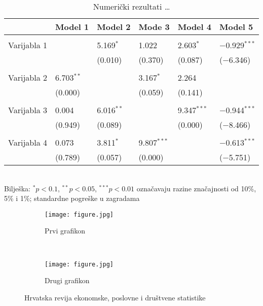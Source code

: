 \documentclass{crebsshr}
\begin{document}
	\medskip
	\begin{table}[H]
	\centering
	\caption{Numerički rezultati \dots}
	\label{tab:tab1}
	\small
	\begin{tabular}{l|lllll} \toprule
		& Model 1   & Model 2  & Mode 3  & Model 4  & Model 5 \\ \hline \hline
		&&&&& \\ [-1em]
		Varijabla 1 &       & 5.169$^{*}$ & 1.022 & 2.603$^{*}$ & $-$0.929$^{***}$  \\
		&       & (0.010)    & (0.370)    & (0.087)    & ($-$6.346)    \\ &&&&& \\ [-1em]
	Varijabla 2  & 6.703$^{**}$ &       & 3.167$^{*}$ & 2.264 &         \\
		& (0.000)   &       & (0.059)  & (0.141)    &         \\ &&&&& \\ [-1em]
		Varijabla 3 & 0.004 & 6.016$^{**}$ &       & 9.347$^{***}$ & $-$0.944$^{***}$  \\
		&    (0.949)   &   (0.089)    &       & (0.000)  &  ($-$8.466)      \\ &&&&& \\ [-1em]
		Varijabla 4 & 0.073 & 3.811$^{*}$ & 9.807$^{***}$ &       & $-$0.613$^{***}$  \\
		& (0.789)    & (0.057)    & (0.000)    &       &  ($-$5.751)     \\ \bottomrule
	\end{tabular} \\
	\vspace{1ex} \footnotesize {Bilješka: $^{*} p < 0.1$, $^{**} p < 0.05$, $^{***} p < 0.01$ označavaju razine značajnosti od 10\%, 5\% i 1\%; standardne pogreške u zagradama}
\end{table}

	\begin{figure}[H]
		\centering
		\begin{subfigure}{0.25\textwidth}
			\texttt{[image: figure.jpg]}
			\caption{Prvi grafikon}
		\end{subfigure}~~~~\begin{subfigure}{0.25\textwidth}
			\texttt{[image: figure.jpg]}
			\caption{Drugi grafikon}
		\end{subfigure}
	\caption{Hrvatska revija ekonomske, poslovne i društvene statistike}
	\label{fig:fig2}
	\end{figure}


\end{document}
